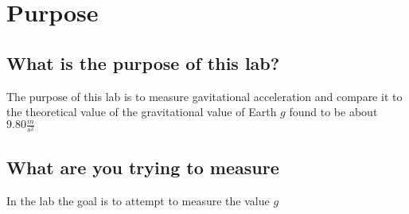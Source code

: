 \chapter{Purpose}
\section{What is the purpose of this lab?}
The purpose of this lab is to measure gavitational acceleration and compare it to the theoretical value
of the gravitational value of Earth $g$ found to be about $9.80\frac{m}{s^2}$
\section{What are you trying to measure}
In the lab the goal is to attempt to measure the value $g$